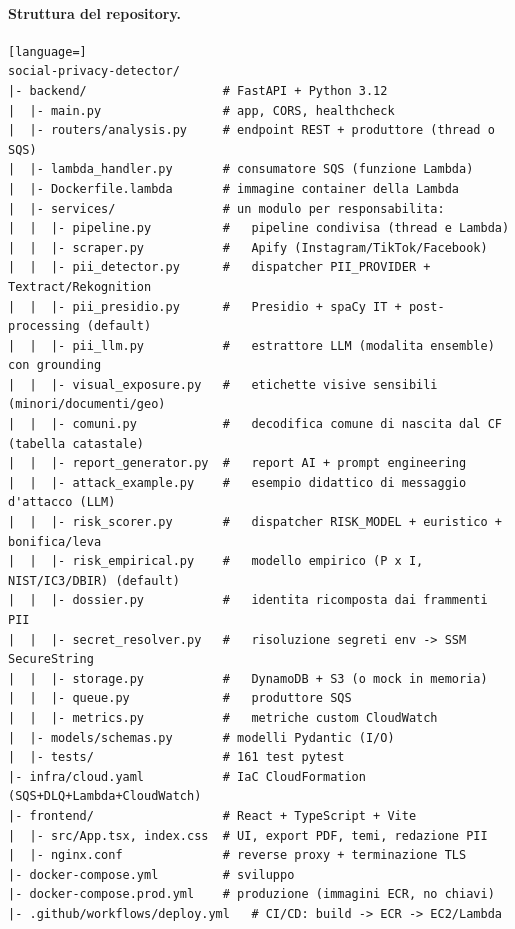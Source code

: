 \documentclass[11pt,a4paper]{article}
\begin{document}
\paragraph{Struttura del repository.}
\begin{lstlisting}[language=]
social-privacy-detector/
|- backend/                   # FastAPI + Python 3.12
|  |- main.py                 # app, CORS, healthcheck
|  |- routers/analysis.py     # endpoint REST + produttore (thread o SQS)
|  |- lambda_handler.py       # consumatore SQS (funzione Lambda)
|  |- Dockerfile.lambda       # immagine container della Lambda
|  |- services/               # un modulo per responsabilita:
|  |  |- pipeline.py          #   pipeline condivisa (thread e Lambda)
|  |  |- scraper.py           #   Apify (Instagram/TikTok/Facebook)
|  |  |- pii_detector.py      #   dispatcher PII_PROVIDER + Textract/Rekognition
|  |  |- pii_presidio.py      #   Presidio + spaCy IT + post-processing (default)
|  |  |- pii_llm.py           #   estrattore LLM (modalita ensemble) con grounding
|  |  |- visual_exposure.py   #   etichette visive sensibili (minori/documenti/geo)
|  |  |- comuni.py            #   decodifica comune di nascita dal CF (tabella catastale)
|  |  |- report_generator.py  #   report AI + prompt engineering
|  |  |- attack_example.py    #   esempio didattico di messaggio d'attacco (LLM)
|  |  |- risk_scorer.py       #   dispatcher RISK_MODEL + euristico + bonifica/leva
|  |  |- risk_empirical.py    #   modello empirico (P x I, NIST/IC3/DBIR) (default)
|  |  |- dossier.py           #   identita ricomposta dai frammenti PII
|  |  |- secret_resolver.py   #   risoluzione segreti env -> SSM SecureString
|  |  |- storage.py           #   DynamoDB + S3 (o mock in memoria)
|  |  |- queue.py             #   produttore SQS
|  |  |- metrics.py           #   metriche custom CloudWatch
|  |- models/schemas.py       # modelli Pydantic (I/O)
|  |- tests/                  # 161 test pytest
|- infra/cloud.yaml           # IaC CloudFormation (SQS+DLQ+Lambda+CloudWatch)
|- frontend/                  # React + TypeScript + Vite
|  |- src/App.tsx, index.css  # UI, export PDF, temi, redazione PII
|  |- nginx.conf              # reverse proxy + terminazione TLS
|- docker-compose.yml         # sviluppo
|- docker-compose.prod.yml    # produzione (immagini ECR, no chiavi)
|- .github/workflows/deploy.yml   # CI/CD: build -> ECR -> EC2/Lambda
\end{lstlisting}
\end{document}
